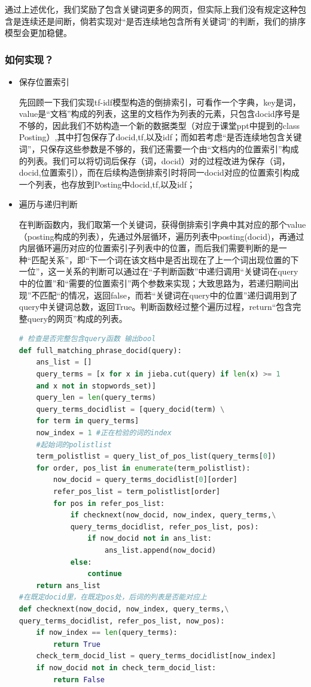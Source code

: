 \documentclass{ctexart}
\begin{document}
通过上述优化，我们奖励了包含关键词更多的网页，\alert{但实际上我们没有规定这种包含是连续还是间断}，倘若实现\alert{对“是否连续地包含所有关键词”的判断}，我们的排序模型会更加稳健。
\subsubsection{如何实现？}
\begin{itemize}
\item 保存位置索引

先回顾一下我们实现tf-idf模型构造的倒排索引，可看作一个字典，key是词，value是“文档”构成的列表，这里的文档作为列表的元素，只包含docid序号是不够的，因此我们不妨构造一个新的数据类型（对应于课堂ppt中提到的class Posting）,其中打包保存了docid,tf,以及idf；而如若考虑“是否连续地包含关键词”，只保存这些参数是不够的，我们还需要一个由“文档内的位置索引”构成的列表。我们可以将切词后保存（词，docid）对的过程改进为保存（词，docid,位置索引），而在后续构造倒排索引时将同一docid对应的位置索引构成一个列表，也存放到Posting中\alert{docid,tf,以及idf}；

\item 遍历与递归判断

在判断函数内，我们取第一个关键词，获得倒排索引字典中其对应的那个value（posting构成的列表），先通过外层循环，遍历列表中posting(docid)，再通过内层循环遍历对应的位置索引子列表中的位置，而后我们需要判断的是一种“匹配关系”，即“下一个词在该文档中是否出现在了上一个词出现位置的下一位”，这一关系的判断可以通过在“子判断函数”中递归调用“关键词在query中的位置”和“需要的位置索引”两个参数来实现；大致思路为，若递归期间出现”不匹配“的情况，返回false，而若“关键词在query中的位置”递归调用到了query中关键词总数，返回True。判断函数经过整个遍历过程，return“包含完整query的网页”构成的列表。
\begin{lstlisting}[language=Python]
# 检查是否完整包含query函数 输出bool
def full_matching_phrase_docid(query):
    ans_list = []
    query_terms = [x for x in jieba.cut(query) if len(x) >= 1 
    and x not in stopwords_set)]
    query_len = len(query_terms)
    query_terms_docidlist = [query_docid(term) \
    for term in query_terms]
    now_index = 1 #正在检验的词的index
    #起始词的polistlist
    term_polistlist = query_list_of_pos_list(query_terms[0]) 
    for order, pos_list in enumerate(term_polistlist):
        now_docid = query_terms_docidlist[0][order] 
        refer_pos_list = term_polistlist[order]
        for pos in refer_pos_list:
            if checknext(now_docid, now_index, query_terms,\
            query_terms_docidlist, refer_pos_list, pos):
                if now_docid not in ans_list:
                    ans_list.append(now_docid)
            else:
                continue
    return ans_list
#在既定docid里，在既定pos处，后词的列表是否能对应上
def checknext(now_docid, now_index, query_terms,\
query_terms_docidlist, refer_pos_list, now_pos):
    if now_index == len(query_terms):
        return True
    check_term_docid_list = query_terms_docidlist[now_index]
    if now_docid not in check_term_docid_list: 
        return False
    

\end{lstlisting}
\end{itemize}
\end{document}

